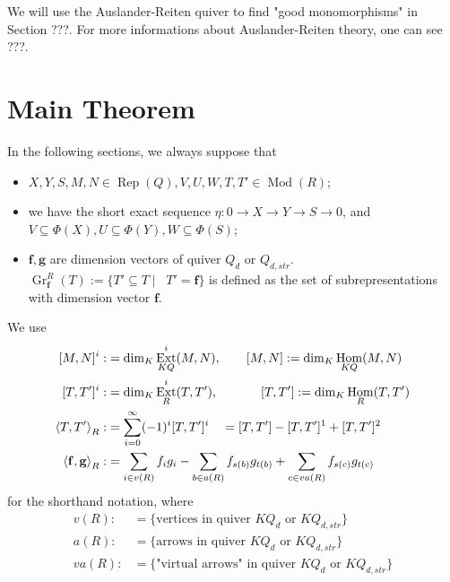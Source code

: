 \documentclass[reqno,11pt]{amsart}
\numberwithin{equation}{section}
\theoremstyle{plain}
\theoremstyle{plain}
\numberwithin{equation}{section}
\theoremstyle{remark}
\DeclareMathOperator{\Rep}{\operatorname{Rep}}
\DeclareMathOperator{\Mod}{\operatorname{Mod}}
\DeclareMathOperator{\Hom}{\operatorname{Hom}}
\DeclareMathOperator{\Ext}{\operatorname{Ext}}
\DeclareMathOperator{\dimv}{\operatorname{\underline{\mathbf{dim}}}}
\newcommand{\Grr}{\operatorname{Gr}^{R}}
\newcommand{\dimvec}[1]{\mathbf{#1}}
\begin{document}
We will use the Auslander-Reiten quiver to find "good monomorphisms" in Section ???. For more informations about Auslander-Reiten theory, one can see ???.

\section{Main Theorem}
   
   In the following sections, we always suppose that 
   \begin{itemize}
   		\item $X,Y,S,M,N \in \Rep(Q), V,U,W,T,T' \in \Mod(R)$;
   		\item we have the short exact sequence $\eta:0\longrightarrow X \longrightarrow Y \longrightarrow S \longrightarrow 0$, and $V \subseteq \Phi(X), U \subseteq \Phi(Y), W \subseteq \Phi(S)$;
   		\item $\dimvec{f},\dimvec{g}$ are dimension vectors of quiver $Q_d$ or $Q_{d,str}$. $\Grr_{\dimvec{f}}(T):= \{ T' \subseteq T \mid \dimv T'=\dimvec{f} \}$ is defined as the set of subrepresentations with dimension vector $\dimvec{f}$.
   \end{itemize}
We use 
\begin{equation*}
\begin{aligned}[]
	[M,N]^i:&=\dim_K \Ext^i_{KQ} (M,N),\qquad [M,N]:=\dim_K \Hom_{KQ} (M,N)\\
	[T,T']^i:&=\dim_K \Ext^i_R (T,T'),\qquad\hspace{0.5cm} [T,T']:=\dim_K \Hom_R (T,T')\\
	\left< T,T'\right>_R:&= \sum_{i=0}^{\infty} (-1)^i [T,T']^i \quad=[T,T']-[T,T']^1+[T,T']^2\\
	\left< \dimvec{f},\dimvec{g}\right>_R:&= \sum_{i \in v(R)} f_ig_i - \sum_{b \in a(R)} f_{s(b)}g_{t(b)}+ \sum_{c \in va(R)} f_{s(c)}g_{t(c)}
\end{aligned}
\end{equation*}
for the shorthand notation, where
\begin{equation*}
\begin{aligned}
	v(R):&= \{\text{vertices in quiver $KQ_d$ or $KQ_{d,str}$}\} \\
	a(R):&= \{\text{arrows in quiver $KQ_d$ or $KQ_{d,str}$}\} \\
	va(R):&= \{\text{"virtual arrows" in quiver $KQ_d$ or $KQ_{d,str}$}\} \\
\end{aligned}
\end{equation*}
\end{document}
